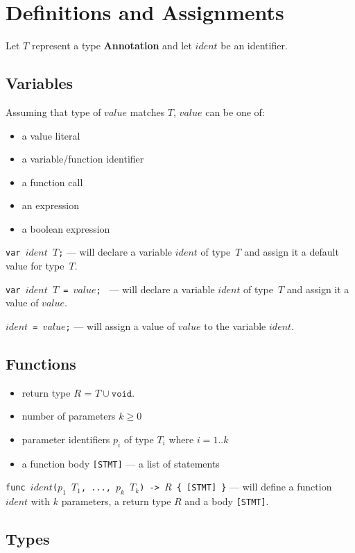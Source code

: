 \documentclass{article}
\begin{document}
\section{Definitions and Assignments}
\label{def}
Let $T$ represent a type \textbf{Annotation} and let $ident$ be an identifier.

\subsection{Variables}
Assuming that type of $value$ matches $T$, $value$ can be one of:
\begin{itemize}
  \setlength\itemsep{.1em}
  \item a value literal
  \item a variable/function identifier
  \item a function call
  \item an expression
  \item a boolean expression
\end{itemize}

\texttt{var $ident$ $T$;} --- will declare a variable $ident$ of type~$T$ and
assign it a default value for type~$T$.

\texttt{var $ident$ $T$ = $value$; } --- will declare a variable $ident$ of
type~$T$ and assign it a value of $value$.

\texttt{$ident$ = $value$;} --- will assign a value of $value$ to the variable
$ident$.

\subsection{Functions}
\label{def-functions}
\begin{itemize}
  \setlength\itemsep{.1em}
  \item return type $R$ = $T \cup { \texttt{void} }$.
  \item number of parameters $k \geq 0$
  \item parameter identifiers $p_i$ of type $T_i$ where $i = 1..k$
  \item a function body \texttt{[STMT]} --- a list of statements
\end{itemize}

\texttt{func $ident$($p_1$ $T_1$, ..., $p_k$ $T_k$) -> $R$ \{ [STMT] \}} --- will
define a function $ident$ with $k$ parameters, a return type $R$ and a body
\texttt{[STMT]}.

\subsection{Types}
\end{document}
